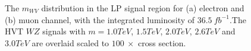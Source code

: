 \begin{figure}[h]
	\centering
	\caption{The $m_{WV}$ distribution in the LP signal region for (a) electron and (b) muon channel, with the integrated luminosity of $36.5~fb^{-1}$.The HVT $WZ$ signals with $m=1.0TeV$, $1.5TeV$, $2.0TeV$, $2.6TeV$ and $3.0TeV$ are overlaid 
	scaled to $100 ~\times$ cross section.}
	\label{Fig:LowPuritySR}
\end{figure}
%

